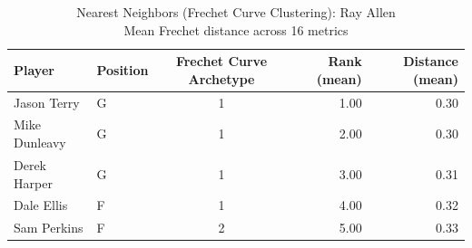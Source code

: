 \begin{table}[t]
\caption*{
{\fontsize{20}{25} Nearest Neighbors (Frechet Curve Clustering): Ray Allen\fontsize{12}{15}\selectfont } \\ 
{\fontsize{14}{17}\selectfont  Mean Frechet distance across 16 metrics\fontsize{12}{15}\selectfont }
} 
\fontsize{12.0pt}{14.0pt}\selectfont
\begin{tabular*}{\linewidth}{@{\extracolsep{\fill}}llcrr}
\toprule
Player & Position & Frechet Curve Archetype & Rank (mean) & Distance (mean) \\ 
\midrule\addlinespace[2.5pt]
Jason Terry & G & 1 & 1.00 & 0.30 \\ 
Mike Dunleavy & G & 1 & 2.00 & 0.30 \\ 
Derek Harper & G & 1 & 3.00 & 0.31 \\ 
Dale Ellis & F & 1 & 4.00 & 0.32 \\ 
Sam Perkins & F & 2 & 5.00 & 0.33 \\ 
\bottomrule
\end{tabular*}
\end{table}

